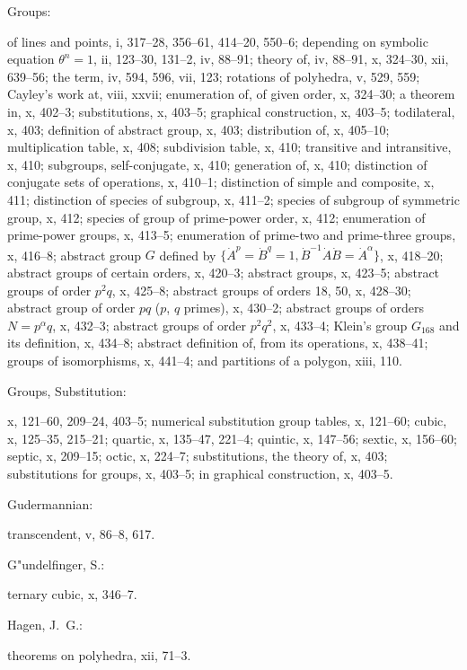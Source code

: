 \documentclass[11pt,a4paper]{book}
\providecommand{\V}[1]{#1}
\providecommand{\IndexEntry}[2]{#1\dotfill #2\par}
\begin{document}
\IndexEntry{Groups}: of lines and points, \V{i}, 317--28, 356--61, 414--20, 550--6; depending on symbolic equation $\theta^n = 1$, \V{ii}, 123--30, 131--2, \V{iv}, 88--91; theory of, \V{iv}, 88--91, \V{x}, 324--30, \V{xii}, 639--56; the term, \V{iv}, 594, 596, \V{vii}, 123; rotations of polyhedra, \V{v}, 529, 559; Cayley's work at, \V{viii}, xxvii; enumeration of, of given order, \V{x}, 324--30; a theorem in, \V{x}, 402--3; substitutions, \V{x}, 403--5; graphical construction, \V{x}, 403--5; todilateral, \V{x}, 403; definition of abstract group, \V{x}, 403; distribution of, \V{x}, 405--10; multiplication table, \V{x}, 408; subdivision table, \V{x}, 410; transitive and intransitive, \V{x}, 410; subgroups, self-conjugate, \V{x}, 410; generation of, \V{x}, 410; distinction of conjugate sets of operations, \V{x}, 410--1; distinction of simple and composite, \V{x}, 411; distinction of species of subgroup, \V{x}, 411--2; species of subgroup of symmetric group, \V{x}, 412; species of group of prime-power order, \V{x}, 412; enumeration of prime-power groups, \V{x}, 413--5; enumeration of prime-two and prime-three groups, \V{x}, 416--8; abstract group $G$ defined by $\{\dot{A}^p = \dot{B}^q = 1, \dot{B}^{-1}\dot{A}\dot{B} = \dot{A}^\alpha\}$, \V{x}, 418--20; abstract groups of certain orders, \V{x}, 420--3; abstract groups, \V{x}, 423--5; abstract groups of order $p^2q$, \V{x}, 425--8; abstract groups of orders 18, 50, \V{x}, 428--30; abstract group of order $pq$ ($p$, $q$ primes), \V{x}, 430--2; abstract groups of orders $N = p^\alpha q$, \V{x}, 432--3; abstract groups of order $p^2q^2$, \V{x}, 433--4; Klein's group $G_{168}$ and its definition, \V{x}, 434--8; abstract definition of, from its operations, \V{x}, 438--41; groups of isomorphisms, \V{x}, 441--4; and partitions of a polygon, \V{xiii}, 110.

\IndexEntry{Groups, Substitution}: \V{x}, 121--60, 209--24, 403--5; numerical substitution group tables, \V{x}, 121--60; cubic, \V{x}, 125--35, 215--21; quartic, \V{x}, 135--47, 221--4; quintic, \V{x}, 147--56; sextic, \V{x}, 156--60; septic, \V{x}, 209--15; octic, \V{x}, 224--7; substitutions, the theory of, \V{x}, 403; substitutions for groups, \V{x}, 403--5; in graphical construction, \V{x}, 403--5.

\IndexEntry{Gudermannian}: transcendent, \V{v}, 86--8, 617.

\IndexEntry{G"undelfinger, S.}: ternary cubic, \V{x}, 346--7.

\IndexEntry{Hagen, J.\ G.}: theorems on polyhedra, \V{xii}, 71--3.
\end{document}
